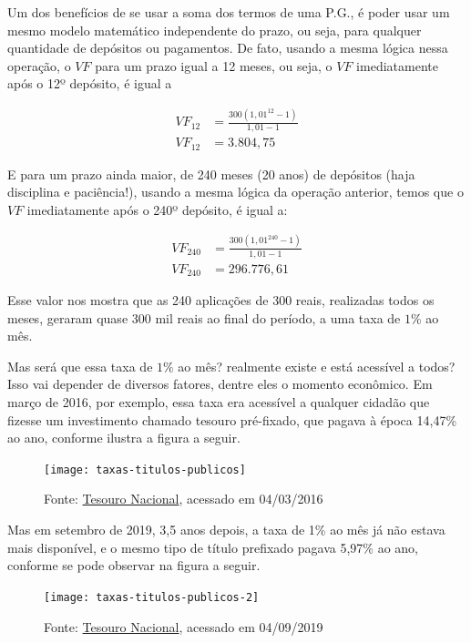 Um dos benefícios de se usar a soma dos termos de uma P.G., é poder usar um mesmo modelo matemático independente do prazo, ou seja, para qualquer quantidade de depósitos ou pagamentos. De fato, usando a mesma lógica nessa operação, o $\mathit{VF}$ para um prazo igual a 12 meses, ou seja, o $\mathit{VF}$ imediatamente após o 12º depósito, é igual a

\begin{align*}
\mathit{VF}_{12}&=\frac{300(1{,}01^{12}-1)}{1{,}01-1}\\
\mathit{VF}_{12}&=3.804{,}75
\end{align*}

E para um prazo ainda maior, de 240 meses (20 anos) de depósitos (haja disciplina e paciência!), usando a mesma lógica da operação anterior, temos que o $\mathit{VF}$ imediatamente após o 240º depósito, é igual a:

\begin{align*}
\mathit{VF}_{240}&=\frac{300(1{,}01^{240}-1)}{1,01-1}\\
\mathit{VF}_{240}&=296.776{,}61
\end{align*}

Esse valor nos mostra que as 240 aplicações de 300 reais, realizadas todos os meses, geraram quase 300 mil reais ao final do período, a uma taxa de $1$\% ao mês. 


Mas será que essa taxa de $1\%$ ao mês? realmente existe e está acessível a todos? Isso vai depender de diversos fatores, dentre eles o momento econômico. Em março de 2016, por exemplo, essa taxa era acessível a qualquer cidadão que fizesse um investimento chamado tesouro pré-fixado, que pagava à época 14,47\% ao ano, conforme ilustra a figura a seguir.

\begin{figure}[H]

\centering
\texttt{[image: taxas-titulos-publicos]}
\caption{Fonte: \href{http://www.tesouro.fazenda.gov.br/tesouro-direto-precos-e-taxas-dos-titulos}{Tesouro Nacional}, acessado em 04/03/2016}

\end{figure}

Mas em setembro de 2019, 3,5 anos depois, a taxa de 1\% ao mês já não estava mais disponível, e o mesmo tipo de título prefixado pagava 5,97\% ao ano, conforme se pode observar na figura a seguir.

\begin{figure}[H]

\centering
\texttt{[image: taxas-titulos-publicos-2]}
\caption{Fonte: \href{http://www.tesouro.fazenda.gov.br/tesouro-direto-precos-e-taxas-dos-titulos}{Tesouro Nacional}, acessado em 04/09/2019}

\end{figure}

